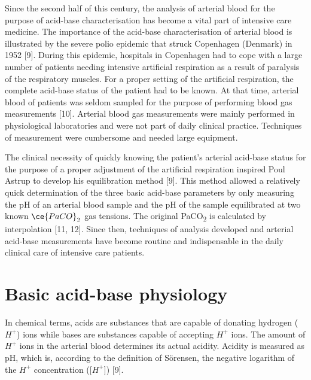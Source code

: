 \documentclass[
  12pt,
  a4paperpaper,
]{report}
\begin{document}
Since the second half of this century, the analysis of arterial blood
for the purpose of acid-base characterisation has become a vital part of
intensive care medicine. The importance of the acid-base
characterisation of arterial blood is illustrated by the severe polio
epidemic that struck Copenhagen (Denmark) in 1952 {[}9{]}. During this
epidemic, hospitals in Copenhagen had to cope with a large number of
patients needing intensive artificial respiration as a result of
paralysis of the respiratory muscles. For a proper setting of the
artificial respiration, the complete acid-base status of the patient had
to be known. At that time, arterial blood of patients was seldom sampled
for the purpose of performing blood gas measurements {[}10{]}. Arterial
blood gas measurements were mainly performed in physiological
laboratories and were not part of daily clinical practice. Techniques of
measurement were cumbersome and needed large equipment.

The clinical necessity of quickly knowing the patient's arterial
acid-base status for the purpose of a proper adjustment of the
artificial respiration inspired Poul Astrup to develop his equilibration
method {[}9{]}. This method allowed a relatively quick determination of
the three basic acid-base parameters by only measuring the pH of an
arterial blood sample and the pH of the sample equilibrated at two known
\(\ce{PaCO}_{2}\) gas tensions. The original PaCO­\textsubscript{2} is
calculated by interpolation {[}11, 12{]}. Since then, techniques of
analysis developed and arterial acid-base measurements have become
routine and indispensable in the daily clinical care of intensive care
patients.

\hypertarget{basic-acid-base-physiology}{%
\section{Basic acid-base physiology}\label{basic-acid-base-physiology}}

In chemical terms, acids are substances that are capable of donating
hydrogen (\(H^{+}\)) ions while bases are substances capable of
accepting \(H^{+}\) ions. The amount of \(H^{+}\) ions in the arterial
blood determines its actual acidity. Acidity is measured as pH, which
is, according to the definition of Sörensen, the negative logarithm of
the \(H^{+}\) concentration ({[}\(H^{+}\){]}) {[}9{]}.
\end{document}
